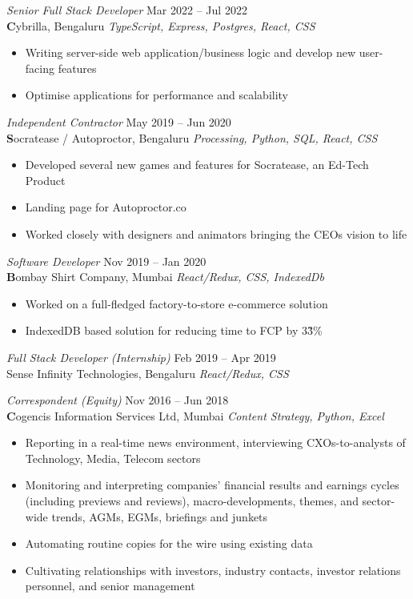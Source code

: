 \documentclass[margin, 10pt]{res} %
\begin{document}
\begin{resume}
{\sl Senior Full Stack Developer} \hfill Mar 2022 –  Jul 2022 \color{Black} \\
\textbf Cybrilla, Bengaluru \hfill {\scriptsize \it TypeScript, Express, Postgres, React, CSS}
\begin{itemize}
\item Writing server-side web application/business logic and develop new user-facing features
\item Optimise applications for performance and scalability
\end{itemize}

{\sl Independent Contractor} \hfill May 2019 – Jun 2020 \\
\textbf Socratease / Autoproctor, Bengaluru \hfill {\scriptsize \it Processing, Python, SQL, React, CSS}
\begin{itemize}
\item Developed several new games and features for Socratease, an Ed-Tech Product
\item Landing page for Autoproctor.co
\item Worked closely with designers and animators bringing the CEOs vision to life 
\end{itemize}

{\sl Software Developer} \hfill Nov 2019 – Jan 2020 \\
\textbf Bombay Shirt Company, Mumbai \hfill {\scriptsize \it React/Redux, CSS, IndexedDb}
\begin{itemize}
\item Worked on a full-fledged factory-to-store e-commerce solution
\item IndexedDB based solution for reducing time to FCP by 3\~3\%
\end{itemize}
{\sl Full Stack Developer (Internship)} \hfill Feb 2019 – Apr 2019 \\
Sense Infinity Technologies, Bengaluru \hfill {\scriptsize \it React/Redux, CSS}

{\sl Correspondent (Equity)} \hfill Nov 2016 – Jun 2018 \\
\textbf Cogencis Information Services Ltd, Mumbai \hfill {\scriptsize \it Content Strategy, Python, Excel}
\begin{itemize}
\item Reporting in a real-time news environment, interviewing CXOs-to-analysts of Technology, Media, Telecom sectors
\item Monitoring and interpreting companies’ financial results and earnings cycles (including previews and reviews), macro-developments, themes, and sector-wide trends, AGMs, EGMs, briefings and junkets
\item Automating routine copies for the wire using existing data
\item Cultivating relationships with investors, industry contacts, investor relations personnel, and senior management


\end{itemize}
\end{resume}
\end{document}
